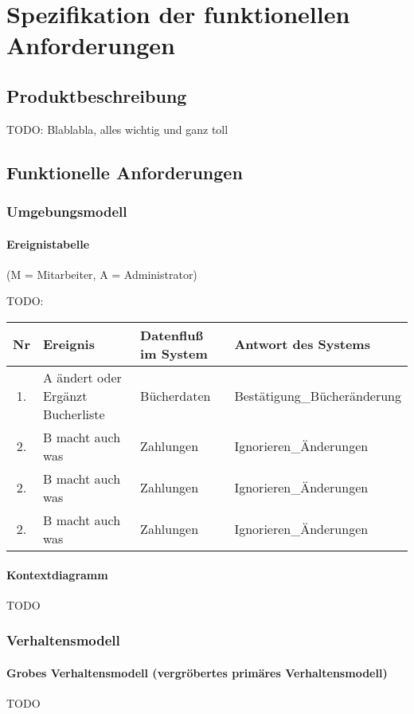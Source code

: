\chapter{Spezifikation der funktionellen Anforderungen}
\section{Produktbeschreibung}
TODO: Blablabla, alles wichtig und ganz toll

\section{Funktionelle Anforderungen}
\subsection{Umgebungsmodell}

\subsubsection{Ereignistabelle}
(M = Mitarbeiter, A = Administrator)

TODO:\\
\begin{tabular}[ht]{|c|p{10em}|l|l|}
\hline
Nr & Ereignis & Datenfluß im System & Antwort des Systems \\
\hline\hline
1. & A ändert oder Ergänzt Bucherliste & Bücherdaten & Bestätigung\_Bücheränderung \\
2. & B macht auch was & Zahlungen & Ignorieren\_Änderungen \\
2. & B macht auch was & Zahlungen & Ignorieren\_Änderungen \\
2. & B macht auch was & Zahlungen & Ignorieren\_Änderungen \\
\hline
\end{tabular}

\subsubsection{Kontextdiagramm}
TODO

\subsection{Verhaltensmodell}
\subsubsection{Grobes Verhaltensmodell (vergröbertes primäres Verhaltensmodell)}
TODO

